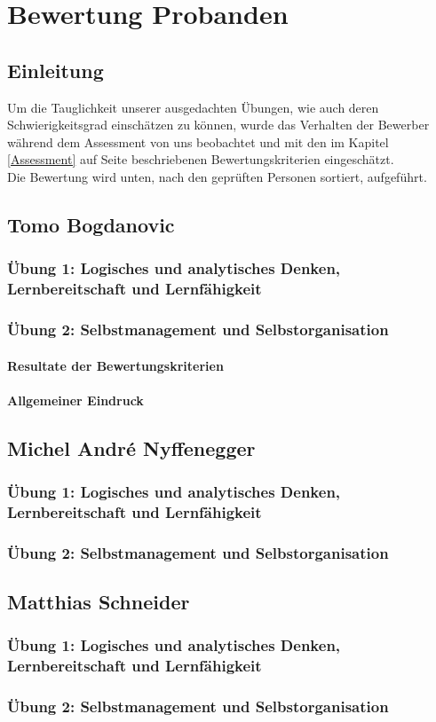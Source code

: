 \chapter{Bewertung Probanden}
\section{Einleitung}
Um die Tauglichkeit unserer ausgedachten Übungen, wie auch deren Schwierigkeitsgrad einschätzen zu können, wurde das Verhalten der Bewerber während dem  Assessment von uns beobachtet und mit den im Kapitel \ref{Assessment} auf Seite \pageref{Assessment} beschriebenen Bewertungskriterien eingeschätzt.\\
Die Bewertung wird unten, nach den geprüften Personen sortiert, aufgeführt.

\section{Tomo Bogdanovic}
\subsection{Übung 1: Logisches und analytisches Denken, Lernbereitschaft und Lernfähigkeit}

\subsection{Übung 2: Selbstmanagement und Selbstorganisation}
\subsubsection{Resultate der Bewertungskriterien}
\subsubsection{Allgemeiner Eindruck}

\section{Michel André Nyffenegger}
\subsection{Übung 1: Logisches und analytisches Denken, Lernbereitschaft und Lernfähigkeit}

\subsection{Übung 2: Selbstmanagement und Selbstorganisation}


\section{Matthias Schneider}
\subsection{Übung 1: Logisches und analytisches Denken, Lernbereitschaft und Lernfähigkeit}

\subsection{Übung 2: Selbstmanagement und Selbstorganisation}

